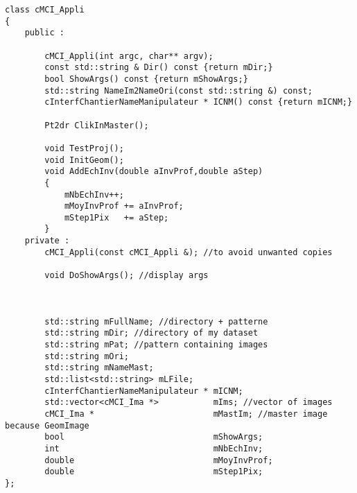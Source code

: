 \documentclass[a4paper]{book}
\begin{document}
\begin{lstlisting}
class cMCI_Appli
{
    public :

        cMCI_Appli(int argc, char** argv);
        const std::string & Dir() const {return mDir;}
        bool ShowArgs() const {return mShowArgs;}
        std::string NameIm2NameOri(const std::string &) const;
        cInterfChantierNameManipulateur * ICNM() const {return mICNM;}

        Pt2dr ClikInMaster();

        void TestProj();
        void InitGeom();
        void AddEchInv(double aInvProf,double aStep)
        {
            mNbEchInv++;
            mMoyInvProf += aInvProf;
            mStep1Pix   += aStep;
        }
    private :
        cMCI_Appli(const cMCI_Appli &); //to avoid unwanted copies

        void DoShowArgs(); //display args



        std::string mFullName; //directory + patterne
        std::string mDir; //directory of my dataset
        std::string mPat; //pattern containing images
        std::string mOri;
        std::string mNameMast;
        std::list<std::string> mLFile;
        cInterfChantierNameManipulateur * mICNM;
        std::vector<cMCI_Ima *>           mIms; //vector of images
        cMCI_Ima *                        mMastIm; //master image because GeomImage
        bool                              mShowArgs;
        int                               mNbEchInv;
        double                            mMoyInvProf;
        double                            mStep1Pix;
};
\end{lstlisting}
\end{document}
